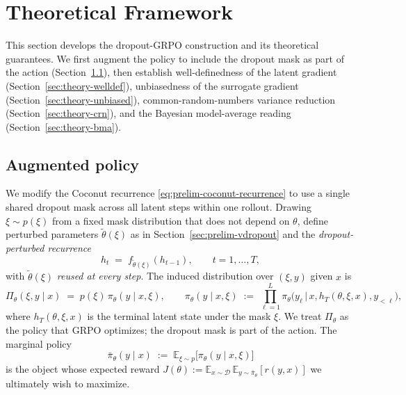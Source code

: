 \documentclass[11pt]{article}
\theoremstyle{definition}
\theoremstyle{remark}
\newcommand{\E}{\mathbb{E}}
\newcommand{\D}{\mathcal{D}}
\begin{document}
\section{Theoretical Framework}
\label{sec:theory}

This section develops the dropout-GRPO construction and its
theoretical guarantees.  We first augment the policy to include the
dropout mask as part of the action
(Section~\ref{sec:theory-augmented}), then establish well-definedness
of the latent gradient (Section~\ref{sec:theory-welldef}), unbiasedness
of the surrogate gradient (Section~\ref{sec:theory-unbiased}),
common-random-numbers variance reduction
(Section~\ref{sec:theory-crn}), and the Bayesian model-average reading
(Section~\ref{sec:theory-bma}).

\subsection{Augmented policy}
\label{sec:theory-augmented}

We modify the Coconut recurrence \eqref{eq:prelim-coconut-recurrence}
to use a single shared dropout mask across all latent steps within
one rollout.  Drawing $\xi \sim p(\xi)$ from a fixed mask distribution
that does not depend on $\theta$, define perturbed parameters
$\tilde\theta(\xi)$ as in Section~\ref{sec:prelim-vdropout} and the
\emph{dropout-perturbed recurrence}
\begin{equation}
h_t \;=\; f_{\tilde\theta(\xi)}(h_{t-1}),
\qquad t = 1, \dots, T,
\label{eq:theory-perturbed}
\end{equation}
with $\tilde\theta(\xi)$ \emph{reused at every step}.  The induced
distribution over $(\xi, y)$ given $x$ is
\begin{equation}
\Pi_\theta(\xi, y \mid x)
   \;=\; p(\xi)\,\pi_\theta(y \mid x, \xi),
\qquad
\pi_\theta(y \mid x, \xi)
   \;:=\; \prod_{\ell=1}^L \pi_\theta\!\big(y_\ell \,\big|\, x, h_T(\theta, \xi, x), y_{<\ell}\big),
\label{eq:theory-augmented-policy}
\end{equation}
where $h_T(\theta, \xi, x)$ is the terminal latent state under the
mask $\xi$.  We treat $\Pi_\theta$ as the policy that GRPO optimizes;
the dropout mask is part of the action.  The marginal policy
\begin{equation}
\bar\pi_\theta(y \mid x)
   \;:=\; \E_{\xi \sim p}\!\big[\pi_\theta(y \mid x, \xi)\big]
\label{eq:theory-marginal-policy}
\end{equation}
is the object whose expected reward
$J(\theta) := \E_{x \sim \D}\, \E_{y \sim \bar\pi_\theta}[r(y, x)]$ we
ultimately wish to maximize.
\end{document}
